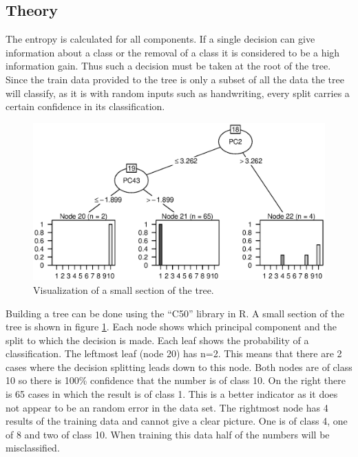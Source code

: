\subsection{Theory}

The entropy is calculated for all components.
If a single decision can give information about a class or the removal of a class it is considered to be a high information gain.
Thus such a decision must be taken at the root of the tree.
Since the train data provided to the tree is only a subset of all the data the tree will classify, as it is with random inputs such as handwriting, every split carries a certain confidence in its classification.

\begin{figure}[h]
\includegraphics[width = \textwidth]{graphics/tree_section}
\caption[Visualization of a tree.]{Visualization of a small section of the tree.}
\label{fig:tree_section}
\end{figure}

Building a tree can be done using the ``C50'' library in R.
A small section of the tree is shown in figure \ref{fig:tree_section}.
Each node shows which principal component and the split to which the decision is made.
Each leaf shows the probability of a classification.
The leftmost leaf (node 20) has n=2. This means that there are 2 cases where the decision splitting leads down to this node.
Both nodes are of class 10 so there is 100\% confidence that the number is of class 10.
On the right there is 65 cases in which the result is of class 1. 
This is a better indicator as it does not appear to be an random error in the data set.
The rightmost node has 4 results of the training data and cannot give a clear picture.
One is of class 4, one of 8 and two of class 10. 
When training this data half of the numbers will be misclassified.

